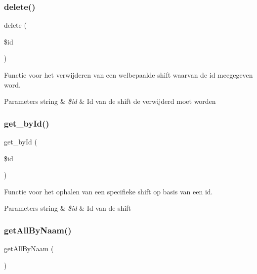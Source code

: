 \subsubsection{\texorpdfstring{delete()}{delete()}}
{\footnotesize\ttfamily delete (\begin{DoxyParamCaption}\item[{}]{\$id }\end{DoxyParamCaption})}



Functie voor het verwijderen van een welbepaalde shift waarvan de id meegegeven word. 


\begin{DoxyParams}[1]{Parameters}
string & {\em \$id} & Id van de shift de verwijderd moet worden \\
\hline
\end{DoxyParams}
\mbox{\label{class_shiften___model_a98d28a4d9a29d40c5a8aa0176f19a919}} 
\subsubsection{\texorpdfstring{get\+\_\+by\+Id()}{get\_byId()}}
{\footnotesize\ttfamily get\+\_\+by\+Id (\begin{DoxyParamCaption}\item[{}]{\$id }\end{DoxyParamCaption})}



Functie voor het ophalen van een specifieke shift op basis van een id. 


\begin{DoxyParams}[1]{Parameters}
string & {\em \$id} & Id van de shift \\
\hline
\end{DoxyParams}
\mbox{\label{class_shiften___model_a2b035b1ffd1cbe651b35bb3e53d72c09}} 
\subsubsection{\texorpdfstring{get\+All\+By\+Naam()}{getAllByNaam()}}
{\footnotesize\ttfamily get\+All\+By\+Naam (\begin{DoxyParamCaption}{ }\end{DoxyParamCaption})}



